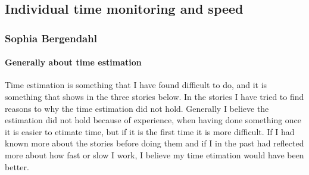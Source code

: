 \subsection{Individual time monitoring and speed}
\subsubsection{Sophia Bergendahl}

\paragraph{Generally about time estimation}

Time estimation is something that I have found difficult to do, and it is something that shows in the three stories below. In the stories I have tried to find reasons to why the time 
estimation did not hold. Generally I believe the estimation did not hold because of experience, when having done something once it is easier to etimate time, but if it is the first time it 
is more difficult. If I had known more about the stories before doing them and if I in the past had reflected more about how fast or slow I work, I believe my time etimation would have been 
better.


